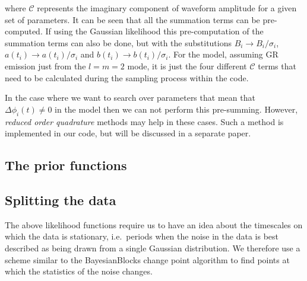 where $\mathcal{C}$ represents the imaginary component of waveform amplitude for a given set of parameters.
It can be seen that all the summation terms can be pre-computed. If using the Gaussian likelihood this
pre-computation of the summation terms can also be done, but with the substitutions $B_i \rightarrow
B_i/\sigma_i$, $a(t_i) \rightarrow a(t_i)/\sigma_i$ and $b(t_i) \rightarrow b(t_i)/\sigma_i$. For the model,
assuming GR emission just from the $l=m=2$ mode, it is just the four different $\mathcal{C}$ terms that need
to be calculated during the sampling process within the code.

In the case where we want to search over parameters that mean that $\Delta\phi_i(t) \ne 0$ in the model then
we can not perform this pre-summing. However, {\it reduced order quadrature} methods
\citep[e.g.][]{2014PhRvX...4c1006F, 2015PhRvL.114g1104C} may help in these cases. Such a method is implemented in our
code, but will be discussed in a separate paper.

\subsection{The prior functions}

\subsection{Splitting the data}\label{sec:splitting}

The above likelihood functions require us to have an idea about the timescales on which the data is
stationary, i.e.\ periods when the noise in the data is best described as being drawn from a single
Gaussian distribution. We therefore use a scheme similar to the BayesianBlocks change point algorithm
\citep{1998ApJ...504..405S} to find points at which the statistics of the noise changes.
